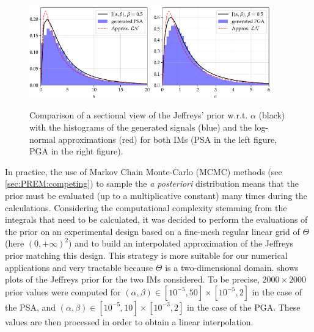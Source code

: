     \begin{figure}[h]
        \centering
        \includegraphics[width=5.2cm]{figures/PREM/PSAjeff.pdf}
        \hspace*{0.5cm}
        \includegraphics[width=5.2cm]{figures/PREM/PGAjeff.pdf}
        \caption{%
        Comparison of a sectional view of the Jeffreys' prior w.r.t. $\alpha$ (black) with the histograms of the generated signals (blue) and the log-normal approximations (red) for both IMs (PSA in the left figure, PGA in the right figure).
        }
        \label{fig:IM}
    \end{figure}

    In practice, the use of Markov Chain Monte-Carlo (MCMC) methods (see \cref{sec:PREM:competing}) to sample the \emph{a posteriori} distribution means that the prior must be evaluated (up to a multiplicative constant) many times during the calculations. Considering the computational complexity stemming from the integrals that need to be calculated, it was decided to perform the evaluations of the prior on an experimental design based on a fine-mesh regular linear grid of $\Theta$ (here $(0,+\infty)^2$) and to build an interpolated approximation of the Jeffreys prior matching this design. This strategy is more suitable for our numerical applications and very tractable because $\Theta$ is a two-dimensional domain.  shows plots of the Jeffreys prior for the two IMs considered. To be precise, $2000\times2000$ prior values were computed for 
    $(\alpha,\beta)\in[10^{-5},50]\times[10^{-5},2]$ in the case of the PSA, and
    $(\alpha,\beta)\in[10^{-5},10]\times[10^{-3},2]$ in the case of the PGA. %
    These values are then processed in order to obtain a linear interpolation. 
 
